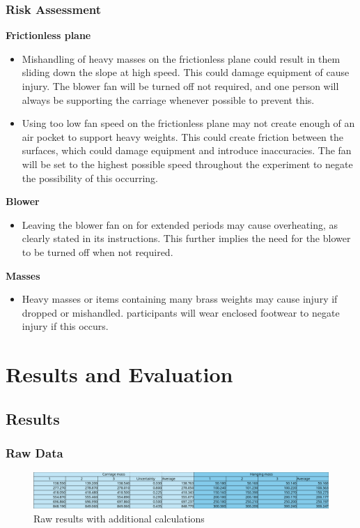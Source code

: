 \documentclass[11pt,a4paper]{article}
\begin{document}
\subsubsection{Risk Assessment}
\textbf{Frictionless plane}
\begin{itemize}
	\item Mishandling of heavy masses on the frictionless plane could result in them sliding down the slope at high speed. This could damage equipment of cause injury. The blower fan will be turned off not required, and one person will always be supporting the carriage whenever possible to prevent this.
	\item Using too low fan speed on the frictionless plane may not create enough of an air pocket to support heavy weights. This could create friction between the surfaces, which could damage equipment and introduce inaccuracies. The fan will be set to the highest possible speed throughout the experiment to negate the possibility of this occurring.
\end{itemize}
\textbf{Blower}
\begin{itemize}
	\item Leaving the blower fan on for extended periods may cause overheating, as clearly stated in its instructions. This further implies the need for the blower to be turned off when not required.
\end{itemize}
\textbf{Masses}
\begin{itemize}
	\item Heavy masses or items containing many brass weights may cause injury if dropped or mishandled. participants will wear enclosed footwear to negate injury if this occurs.  
\end{itemize}
\section{Results and Evaluation}
\subsection{Results}

\subsubsection{Raw Data}
\begin{center}
	\centering
	\begin{figure}[h]
		\centering
		\includegraphics[width=0.84\paperwidth]{resultstable.png}
		\caption{Raw results with additional calculations}
	\end{figure}
	
\end{center}
\end{document}
